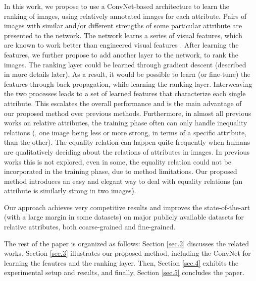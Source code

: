 In this work, we propose to use a ConvNet-based architecture to learn the ranking of images, using relatively annotated images for each attribute. Pairs of images with similar and/or different strengths of some particular attribute are presented to the network. The network  learns a series of visual features, which are known to work better than engineered visual features \cite{offtheshelf}. After learning the features, we further propose to add another layer to the network, to rank the images. The ranking layer could be learned through gradient descent (described in more details later). As a result, it would be possible to learn (or fine-tune) the features through back-propagation, while learning the ranking layer. Interweaving the two processes leads to a set of learned features that characterize each single attribute. This escalates the overall performance and is the main advantage of our proposed method over previous methods. Furthermore, in almost all previous works on relative attributes, the training phase often can only handle inequality relations (\ie, one image being less or more strong, in terms of a specific attribute, than the other). The equality relation can happen quite frequently when humans are qualitatively deciding about the relations of attributes in images. In previous works this is not explored, even in some, the equality relation could not be incorporated in the training phase, due to method limitations. Our proposed method introduces an easy and elegant way to deal with equality relations (\ie an attribute is similarly strong in two images).

Our approach achieves very competitive results and improves the state-of-the-art (with a large margin in some datasets) on major publicly available datasets for relative attributes, both coarse-grained and fine-grained.

The rest of the paper is organized as follows: Section \ref{sec.2} discusses the related works. Section \ref{sec.3} illustrates our proposed method, including the ConvNet for learning the feautres and the ranking layer. Then, Section \ref{sec.4} exhibits the experimental setup and results, and finally, Section \ref{sec.5} concludes the paper.
